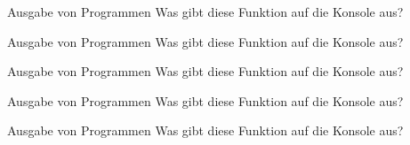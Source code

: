 \begin{task}{Ausgabe von Programmen}
    Was gibt diese Funktion auf die Konsole aus?

    \begin{solution}
    \end{solution}
\end{task}

\begin{task}{Ausgabe von Programmen}
    Was gibt diese Funktion auf die Konsole aus?

    \begin{solution}
    \end{solution}
\end{task}

\begin{task}{Ausgabe von Programmen}
    Was gibt diese Funktion auf die Konsole aus?

    \begin{solution}
    \end{solution}
\end{task}

\begin{task}{Ausgabe von Programmen}
    Was gibt diese Funktion auf die Konsole aus?

    \begin{solution}
    \end{solution}
\end{task}

\begin{task}{Ausgabe von Programmen}
    Was gibt diese Funktion auf die Konsole aus?

    \begin{solution}
    \end{solution}
\end{task}

